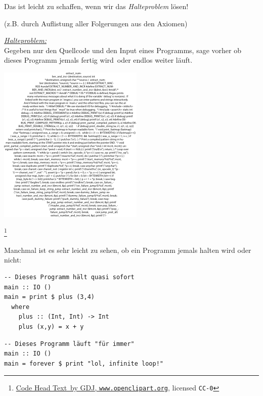 \documentclass[aspectratio=169]{beamer}
\newcommand\blfootnote[1]{%
  \begingroup
  \renewcommand\thefootnote{}\footnote{#1}%
  \addtocounter{footnote}{-1}%
  \endgroup
}
\begin{document}
\begin{frame}
\vspace{20pt}
\begin{multicols}{2}

Das ist leicht zu schaffen, wenn wir das \emph{Halteproblem} lösen!
\smallskip

(z.B. durch Auflistung aller Folgerungen aus den Axiomen)
\bigskip

\emph{\underline{Halteproblem:}}\\

Gegeben nur den Quellcode und den Input eines Programms, sage vorher ob dieses Programm jemals \glqq fertig wird\grqq\ oder endlos weiter läuft.

\columnbreak

\begin{center}
\includegraphics[scale=0.55]{images/CodeHeadText.png} 
\end{center}

\end{multicols}

\blfootnote{\href{https://openclipart.org/detail/274575/code-head-text}{\glqq Code Head Text\grqq\ by GDJ, \texttt{www.openclipart.org}}, licensed \texttt{CC-0}}

\end{frame}


\begin{frame}[fragile]

Manchmal ist es sehr leicht zu sehen, ob ein Programm jemals halten wird oder nicht:

\begin{framed}
\begin{verbatim}
-- Dieses Programm hält quasi sofort
main :: IO ()
main = print $ plus (3,4)
  where
    plus :: (Int, Int) -> Int
    plus (x,y) = x + y
\end{verbatim}
\end{framed}

\pause

\begin{framed}
\begin{verbatim}
-- Dieses Programm läuft "für immer"
main :: IO ()
main = forever $ print "lol, infinite loop!"
\end{verbatim}
\end{framed}

\end{frame}
\end{document}
